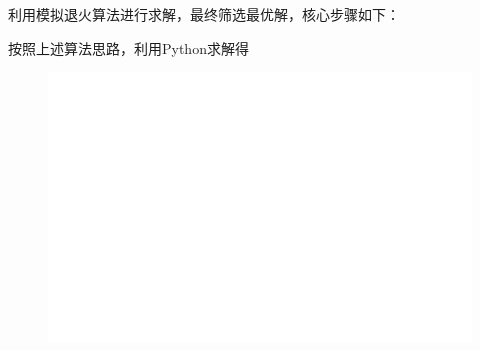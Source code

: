 \documentclass[../main.tex]{subfiles}
\begin{document}

利用模拟退火算法进行求解，最终筛选最优解，核心步骤如下：




按照上述算法思路，利用Python求解得

\begin{figure}[H]
\centering
\includegraphics[scale=0.5]{标记图.png}
\caption{}
\label{图2}
\end{figure}
\end{document}
